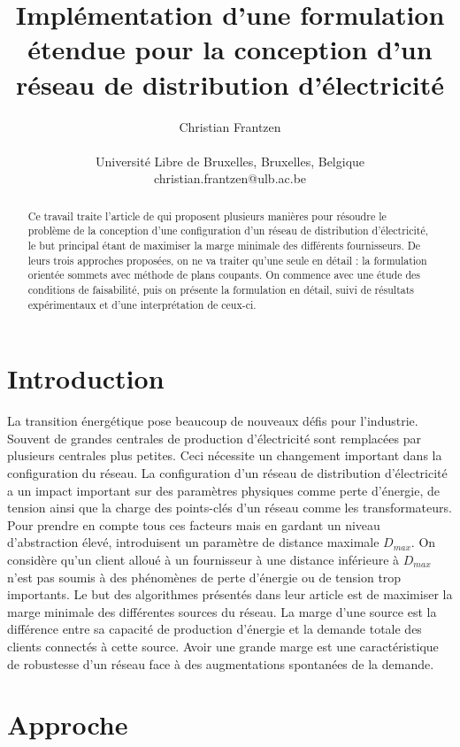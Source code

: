 \documentclass[letterpaper]{article}
\title{Implémentation d'une formulation étendue pour la conception d'un réseau de distribution d'électricité}
\author{Christian Frantzen \\
\mbox{}\\
Université Libre de Bruxelles, Bruxelles, Belgique \\
christian.frantzen@ulb.ac.be}
\begin{document}
\maketitle
\begin{abstract}
Ce travail traite l'article de \citep*{Rossi} qui proposent plusieurs manières pour résoudre le problème de la conception d'une configuration d'un réseau de distribution d'électricité,  le but principal étant de maximiser la marge minimale des différents fournisseurs. De leurs trois approches proposées, on ne va traiter qu'une seule en détail : la formulation orientée sommets avec méthode de plans coupants. On commence avec une étude des conditions de faisabilité, puis on présente la formulation en détail, suivi de résultats expérimentaux et d'une interprétation de ceux-ci. 
\end{abstract}
\section{Introduction}
La transition énergétique pose beaucoup de nouveaux défis pour l'industrie. Souvent de grandes centrales de production d'électricité sont remplacées par plusieurs centrales plus petites. Ceci nécessite un changement important dans la configuration du réseau. La configuration d'un réseau de distribution d'électricité a un impact important sur des paramètres physiques comme perte d'énergie, de tension ainsi que la charge des points-clés d'un réseau comme les transformateurs. Pour prendre en compte tous ces facteurs mais en gardant un niveau d'abstraction élevé, \citep*{Rossi} introduisent un paramètre de distance maximale $D_{max}$. On considère qu'un client alloué à un fournisseur à une distance inférieure à $D_{max}$ n'est pas soumis à des phénomènes de perte d'énergie ou de tension trop importants.\newline \indent
Le but des algorithmes présentés dans leur article est de maximiser la marge minimale des différentes sources du réseau. La marge d'une source est la différence entre sa capacité de production d'énergie et la demande totale des clients connectés à cette source.\newline \indent
Avoir une grande marge est une caractéristique de robustesse d'un réseau face à des augmentations spontanées de la demande.
\section{Approche}
\end{document}
